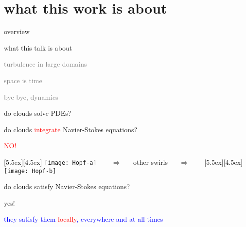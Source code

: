 \begin{frame}
  \titlepage
\end{frame}


\section[what this work is about]
 {what this work is about}

\begin{frame}{overview}
\begin{enumerate}
              \item {\Large
what this talk is about
                  }\textcolor{gray}{\small
              \item
turbulence in large domains
              \item
space is time
              \item
bye bye, dynamics
                    }
            \end{enumerate}
\end{frame}

\begin{frame}{do clouds solve PDEs?}

do clouds \textcolor{red}{integrate} Navier-Stokes equations?

\begin{center}
\centerline{\textcolor{red}{\Huge NO!}}

\begin{minipage}[t]{\textwidth}
	\begin{center}
\centerline{
\raisebox{-4.0ex}[5.5ex][4.5ex]
		 {\texttt{[image: Hopf-a]}}
~~~ $\Longrightarrow$ ~~ {other swirls} ~~ $\Longrightarrow$ ~~~
	\raisebox{-4.0ex}[5.5ex][4.5ex]
		 {\texttt{[image: Hopf-b]}}
          }
	\end{center}
\end{minipage}
\end{center}

do clouds satisfy Navier-Stokes equations?

\bigskip

{\Large yes!}

\centerline{
\textcolor{blue}{they satisfy them \textcolor{red}{\large locally}, everywhere and at all times}
}
\end{frame}

